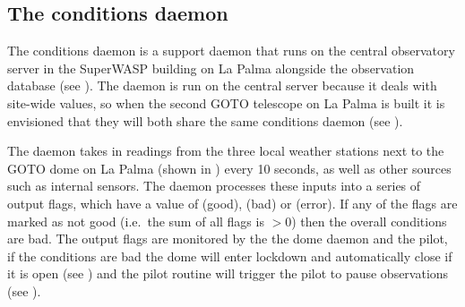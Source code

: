 
\subsection{The conditions daemon}
\label{sec:conditions_daemon}
\begin{colsection}

The conditions daemon is a support daemon that runs on the central observatory server in the SuperWASP building on La Palma alongside the observation database (see ). The daemon is run on the central server because it deals with site-wide values, so when the second GOTO telescope on La Palma is built it is envisioned that they will both share the same conditions daemon (see ).

The daemon takes in readings from the three local weather stations next to the GOTO dome on La Palma (shown in ) every 10 seconds, as well as other sources such as internal sensors. The daemon processes these inputs into a series of output flags, which have a value of  (good),  (bad) or  (error). If any of the flags are marked as not good (i.e.\ the sum of all flags is $>0$) then the overall conditions are bad. The output flags are monitored by the the dome daemon and the pilot, if the conditions are bad the dome will enter lockdown and automatically close if it is open (see ) and the pilot  routine will trigger the pilot to pause observations (see ).


\end{colsection}
